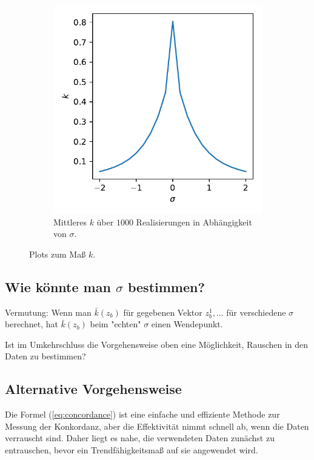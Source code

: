 \documentclass{article}
\theoremstyle{plain}%
\theoremstyle{definition}
\begin{document}
\begin{figure}
\begin{subfigure}{.48\textwidth}
  		\includegraphics[width=\textwidth]{plots/mean_k_over_sigma.pdf}
  		\caption{Mittleres $k$ über $1000$ Realisierungen in Abhängigkeit von $\sigma$.}
	\end{subfigure}
	\caption{Plots zum Maß $k$.}
  	\label{fig:k}
\end{figure}

\subsection{Wie könnte man $\sigma$ bestimmen?}

Vermutung: Wenn man $\bar{k}(z_b)$ für gegebenen Vektor $z_b^1, \dots$ für verschiedene $\sigma$ berechnet, hat $\bar{k}(z_b)$ beim "echten" $\sigma$ einen Wendepunkt.

Ist im Umkehrschluss die Vorgehensweise oben eine Möglichkeit, Rauschen in den Daten zu bestimmen?

\subsection{Alternative Vorgehensweise}
Die Formel (\ref{eq:concordance}) ist eine einfache und effiziente Methode zur Messung der Konkordanz, aber die Effektivität nimmt schnell ab, wenn die Daten verrauscht sind. Daher liegt es nahe, die verwendeten Daten zunächst zu entrauschen, bevor ein Trendfähigkeitsmaß auf sie angewendet wird. 
\end{document}
